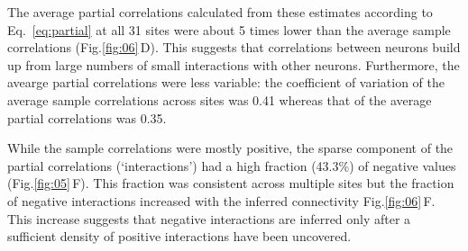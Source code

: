 \documentclass[10pt]{article}
\newcommand{\sq}[1]{\lq#1\rq}
\newcommand{\figref}[2]{Fig.\;\ref{fig:#1}\,#2}
\begin{document}
The average partial correlations calculated from these estimates according to Eq.~\ref{eq:partial} at all 31 sites were about 5 times lower than the average sample correlations (\figref{06}{D}). This suggests that correlations between neurons build up from large numbers of small interactions with other neurons. Furthermore, the avearge partial correlations were less variable: the coefficient of variation of the average sample correlations across sites was 0.41 whereas that of the average partial correlations was 0.35. 

While the sample correlations were mostly positive, the sparse component of the partial correlations (\sq{interactions}) had a high fraction (43.3\%) of negative values (\figref{05}{F}). This fraction was consistent across multiple sites but the fraction of negative interactions increased with the inferred connectivity \figref{06}{F}.  This increase suggests that negative interactions are inferred only after a sufficient density of positive interactions have been uncovered.
\end{document}
